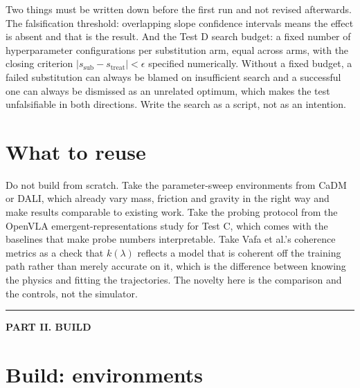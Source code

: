 \documentclass[9pt]{extarticle}
\begin{document}
Two things must be written down before the first run and not revised afterwards. The falsification threshold: overlapping slope confidence intervals means the effect is absent and that is the result. And the Test D search budget: a fixed number of hyperparameter configurations per substitution arm, equal across arms, with the closing criterion $|s_{\text{sub}} - s_{\text{treat}}| < \epsilon$ specified numerically. Without a fixed budget, a failed substitution can always be blamed on insufficient search and a successful one can always be dismissed as an unrelated optimum, which makes the test unfalsifiable in both directions. Write the search as a script, not as an intention.

\section{What to reuse}

Do not build from scratch. Take the parameter-sweep environments from CaDM or DALI, which already vary mass, friction and gravity in the right way and make results comparable to existing work. Take the probing protocol from the OpenVLA emergent-representations study for Test C, which comes with the baselines that make probe numbers interpretable. Take Vafa et al.'s coherence metrics as a check that $k(\lambda)$ reflects a model that is coherent off the training path rather than merely accurate on it, which is the difference between knowing the physics and fitting the trajectories. The novelty here is the comparison and the controls, not the simulator.


\begin{center}\rule{0.35\textwidth}{0.4pt}\end{center}
\begin{center}{\small\bfseries PART II. BUILD}\end{center}

\section{Build: environments}
\end{document}

